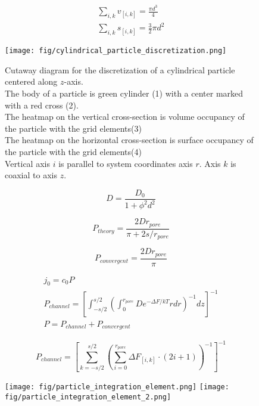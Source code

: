 \documentclass[12pt, a4paper]{article}
\begin{document}
\begin{eqnarray}
    \sum_{i,k} v_{[i,k]} = \frac{\pi d^{3}}{4}
    \\
    \sum_{i,k} s_{[i,k]} = \frac{3}{2} \pi d^{2}
\end{eqnarray}

\begin{figure}
    \centering
    \texttt{[image: fig/cylindrical\_particle\_discretization.png]}
    \caption{Cutaway diagram for the discretization of a cylindrical particle centered along $z$-axis.
    \\The body of a particle is green cylinder (1) with a center marked with a red cross (2).
    \\ The heatmap on the vertical cross-section is volume occupancy of the particle with the grid elements(3)
    \\ The heatmap on the horizontal cross-section is surface occupancy of the particle with the grid elements(4)
    \\
    Vertical axis $i$ is parallel to system coordinates axis $r$. Axis $k$ is coaxial to axis $z$.
    }
\end{figure}

\begin{equation}
    D = \frac{D_{0}}{1+\phi^2 d^2}
\end{equation}

\begin{equation}
    P_{theory} = \frac{2 D r_{pore}}{\pi + 2 s / r_{pore}}
\end{equation}

\begin{equation}
    P_{convergent} = \frac{2 D r_{pore}}{\pi}
\end{equation}

\begin{eqnarray}
    j_0 = c_0 P
    \\
    P_{channel} = \left[\int_{-s/2}^{s/2} \left( \int_{0}^{r_{pore}} D e^{-\Delta F / kT} r dr \right)^{-1} dz \right]^{-1}
    \\
    P = P_{channel}  + P_{convergent}
\end{eqnarray}


\begin{equation}
    P_{channel} = \left[\sum_{k=-s/2}^{s/2} \left( \sum_{i=0}^{r_{pore}} \Delta F_{[i,k]} \cdot (2i+1) \right)^{-1} \right]^{-1}
\end{equation}


\begin{figure}
    \texttt{[image: fig/particle\_integration\_element.png]}
    \texttt{[image: fig/particle\_integration\_element\_2.png]}
\end{figure}
\end{document}
